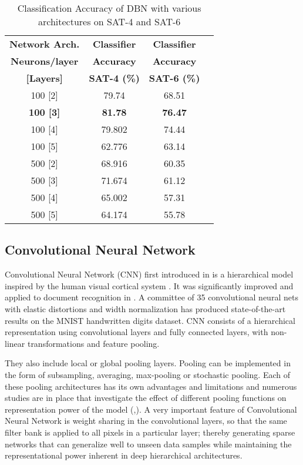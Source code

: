 \documentclass[11pt,a4paper]{article}
\begin{document}
\begin{table}[h]
\centering
\begin{tabular}{ | c | c | c | c | }
    \hline
     \textbf{Network Arch.} & \textbf{Classifier} & \textbf{Classifier}\\ 
    \textbf{Neurons/layer} &   \textbf{Accuracy} & \textbf{Accuracy} \\ 
    \textbf{[Layers]} & \textbf{SAT-4 (\%)} & \textbf{SAT-6 (\%)} \\ \hline
    100 [2] & 79.74  & 68.51 \\ \hline
    \textbf{100 [3]} & \textbf{81.78}  & \textbf{76.47} \\ \hline
    100 [4] & 79.802  & 74.44 \\ \hline
    100 [5] & 62.776  & 63.14 \\ \hline
    500 [2] & 68.916 &  60.35 \\ \hline
    500 [3] &  71.674 &  61.12  \\ \hline
    500 [4] & 65.002  & 57.31 \\ \hline
    500 [5] & 64.174  & 55.78 \\ \hline
  \end{tabular}
  \caption{Classification Accuracy of DBN with various architectures on SAT-4 and SAT-6}
  \label{table:DBN_accuracy_SAT_4_and_SAT_6}
\end{table}

\subsection{Convolutional Neural Network}
Convolutional Neural Network (CNN) first introduced in \cite{fukushima:neocognitronbc} is a hierarchical model inspired by the human visual cortical system \cite{Hubel:62}. It was significantly improved and applied to document recognition in \cite{Lecun98gradient-basedlearning}. A committee of 35 convolutional neural nets with elastic distortions and width normalization \cite{Ciresan2012} has produced state-of-the-art results on the MNIST handwritten digits dataset. CNN consists of a hierarchical representation using convolutional layers and fully connected layers, with non-linear transformations and feature pooling. 

They also include local or global pooling layers. Pooling can be implemented in the form of subsampling, averaging, max-pooling or stochastic pooling. Each of these pooling architectures has its own advantages and limitations and numerous studies are in place that investigate the effect of different pooling functions on representation power of the model (\cite{Scherer2010},\cite{ICML2011Saxe_551}). A very important feature of Convolutional Neural Network is weight sharing in the convolutional layers, so that the same filter bank is applied to all pixels in a particular layer; thereby generating sparse networks that can generalize well to unseen data samples while maintaining the representational power inherent in deep hierarchical architectures. 
\end{document}
